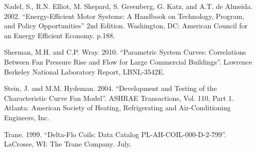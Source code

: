 Nadel, S., R.N. Elliot, M. Shepard, S. Greenberg, G. Katz, and A.T. de Almeida. 2002. ``Energy-Efficient Motor Systems: A Handbook on Technology, Program, and Policy Opportunities'' 2nd Edition. Washington, DC: American Council for an Energy Efficient Economy. p.188.

Sherman, M.H. and C.P. Wray. 2010. ``Parametric System Curves: Correlations Between Fan Pressure Rise and Flow for Large Commercial Buildings''. Lawrence Berkeley National Laboratory Report, LBNL-3542E.

Stein, J. and M.M. Hydeman. 2004. ``Development and Testing of the Characteristic Curve Fan Model''. ASHRAE Transactions, Vol. 110, Part 1. Atlanta: American Society of Heating, Refrigerating and Air-Conditioning Engineers, Inc.

Trane. 1999. ``Delta-Flo Coils: Data Catalog PL-AH-COIL-000-D-2-799''. LaCrosse, WI: The Trane Company. July.
